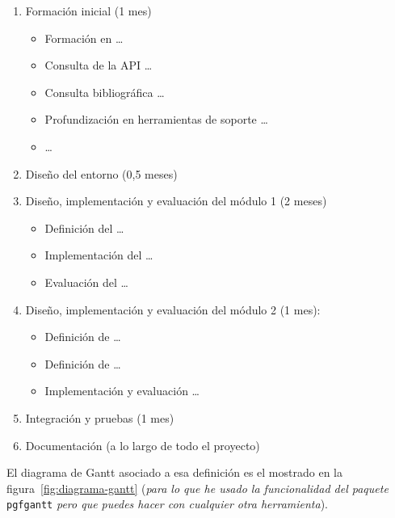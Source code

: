 \documentclass[11pt,a4paper,oneside]{article}
\begin{document}
\begin{enumerate}
  
\item Formación inicial (1 mes)
  
  \begin{itemize}
  \item Formación en \ldots
  \item Consulta de la API \ldots
  \item Consulta bibliográfica \ldots
  \item Profundización en herramientas de soporte \ldots
  \item  \ldots
  \end{itemize}

\item Diseño del entorno (0,5 meses)

\item Diseño, implementación y evaluación del módulo 1 (2 meses)
  \begin{itemize}
  \item Definición del  \ldots
  \item Implementación del  \ldots
  \item Evaluación del  \ldots
  \end{itemize}
  
\item Diseño, implementación y evaluación del módulo 2 (1 mes):
  \begin{itemize}
  \item Definición de  \ldots
  \item Definición de  \ldots
  \item Implementación y evaluación  \ldots
  \end{itemize}

\item Integración y pruebas (1 mes)

\item Documentación (a lo largo de todo el proyecto)

\end{enumerate}

El diagrama de Gantt asociado a esa definición es el mostrado en la figura~\ref{fig:diagrama-gantt} (\textit{para lo que he usado la funcionalidad del paquete} \texttt{pgfgantt} \textit{pero que puedes hacer con cualquier otra herramienta}).
\end{document}
